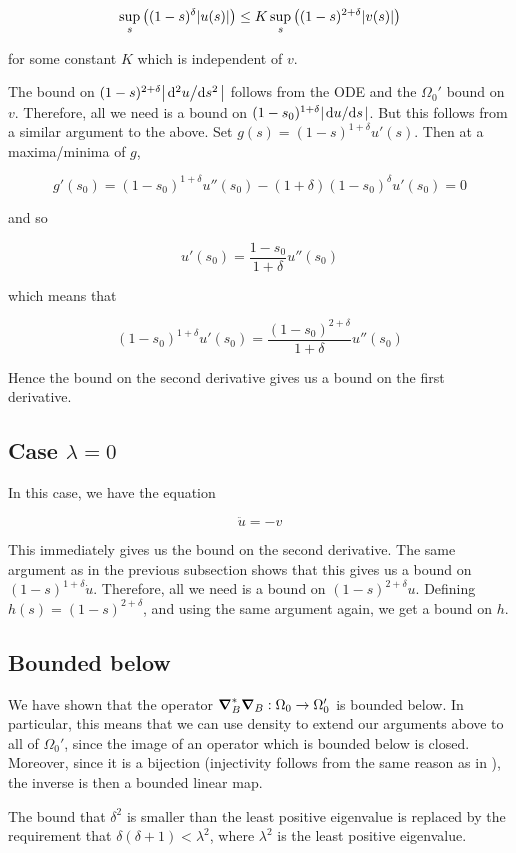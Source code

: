 \documentclass{report}
\begin{document}
\[\sup_s\left((1-s)^\delta\abs{u(s)}\right) \le K\sup_s\left((1-s)^{2+\delta}\abs{v(s)}\right)\]

for some constant \(K\) which is independent of \(v\).

The bound on \((1-s)^{2+\delta}\abs{\dv*[2]{u}{s}}\) follows from the ODE and the \(\Omega_0'\) bound on \(v\). Therefore, all we need is a bound on \((1-s_0)^{1+\delta}\abs{\dv*{u}{s}}\). But this follows from a similar argument to the above. Set \(g(s) = (1-s)^{1+\delta}u'(s)\). Then at a maxima/minima of \(g\),

\[g'(s_0) = (1-s_0)^{1+\delta}u''(s_0) - (1+\delta)(1-s_0)^\delta u'(s_0) = 0\]

and so

\[u'(s_0) = \frac{1-s_0}{1+\delta}u''(s_0)\]

which means that

\[(1-s_0)^{1+\delta}u'(s_0) = \frac{(1-s_0)^{2+\delta}}{1+\delta}u''(s_0)\]

Hence the bound on the second derivative gives us a bound on the first derivative.

\subsection{Case \(\lambda = 0\)}

In this case, we have the equation

\[\ddot u = -v\]

This immediately gives us the bound on the second derivative. The same argument as in the previous subsection shows that this gives us a bound on \((1-s)^{1+\delta}\dot u\). Therefore, all we need is a bound on \((1-s)^{2+\delta}u\). Defining \(h(s) = (1-s)^{2+\delta}\), and using the same argument again, we get a bound on \(h\).

\subsection{Bounded below}

We have shown that the operator \(\grad_B^*\grad_B : \Omega_0 \to \Omega_0'\) is bounded below. In particular, this means that we can use density to extend our arguments above to all of \(\Omega_0'\), since the image of an operator which is bounded below is closed. Moreover, since it is a bijection (injectivity follows from the same reason as in \cite{kronheimer_hyper-kahlerian_1990}), the inverse is then a bounded linear map.

The bound that \(\delta^2\) is smaller than the least positive eigenvalue is replaced by the requirement that \(\delta(\delta + 1) < \lambda^2\), where \(\lambda^2\) is the least positive eigenvalue.
\end{document}
